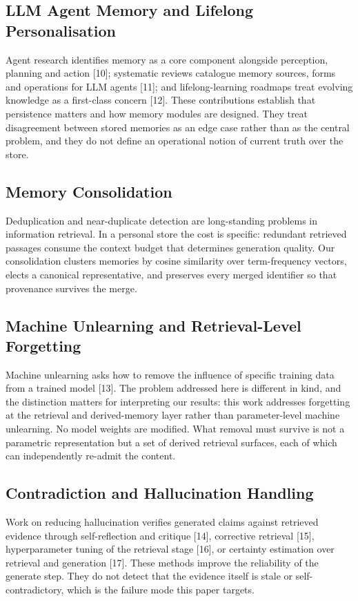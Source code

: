 \documentclass[conference]{IEEEtran}
\begin{document}
\subsection{LLM Agent Memory and Lifelong Personalisation}
Agent research identifies memory as a core component alongside perception, planning and action [10]; systematic reviews catalogue memory sources, forms and operations for LLM agents [11]; and lifelong-learning roadmaps treat evolving knowledge as a first-class concern [12]. These contributions establish that persistence matters and how memory modules are designed. They treat disagreement between stored memories as an edge case rather than as the central problem, and they do not define an operational notion of current truth over the store.
\subsection{Memory Consolidation}
Deduplication and near-duplicate detection are long-standing problems in information retrieval. In a personal store the cost is specific: redundant retrieved passages consume the context budget that determines generation quality. Our consolidation clusters memories by cosine similarity over term-frequency vectors, elects a canonical representative, and preserves every merged identifier so that provenance survives the merge.
\subsection{Machine Unlearning and Retrieval-Level Forgetting}
Machine unlearning asks how to remove the influence of specific training data from a trained model [13]. The problem addressed here is different in kind, and the distinction matters for interpreting our results: this work addresses forgetting at the retrieval and derived-memory layer rather than parameter-level machine unlearning. No model weights are modified. What removal must survive is not a parametric representation but a set of derived retrieval surfaces, each of which can independently re-admit the content.
\subsection{Contradiction and Hallucination Handling}
Work on reducing hallucination verifies generated claims against retrieved evidence through self-reflection and critique [14], corrective retrieval [15], hyperparameter tuning of the retrieval stage [16], or certainty estimation over retrieval and generation [17]. These methods improve the reliability of the generate step. They do not detect that the evidence itself is stale or self-contradictory, which is the failure mode this paper targets.
\end{document}
